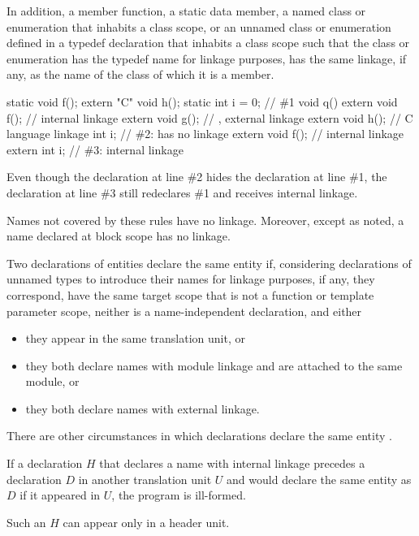 \pnum
In addition,
a member function,
a static data member,
a named class or enumeration that inhabits a class scope, or
an unnamed class or enumeration defined in a typedef declaration
that inhabits a class scope
such that the class or enumeration
has the typedef name for linkage purposes,
has the same linkage, if any, as the name of the class of which it is a member.

\pnum
\begin{example}
\begin{codeblock}
static void f();
extern "C" void h();
static int i = 0;               // \#1
void q() {
  extern void f();              // internal linkage
  extern void g();              // , external linkage
  extern void h();              // C language linkage
  int i;                        // \#2:  has no linkage
  {
    extern void f();            // internal linkage
    extern int i;               // \#3: internal linkage
  }
}
\end{codeblock}
Even though the declaration at line \#2 hides the declaration at line \#1,
the declaration at line \#3 still redeclares \#1 and receives internal linkage.
\end{example}

\pnum
{}%
Names not covered by these rules have no linkage. Moreover, except as
noted, a name declared at block scope has no
linkage.

\pnum
Two declarations of entities declare the same entity
if, considering declarations of unnamed types to introduce their names
for linkage purposes, if any,
they correspond,
have the same target scope that is not a function or template parameter scope,
neither is a name-independent declaration,
and either
\begin{itemize}
\item
they appear in the same translation unit, or
\item
they both declare names with module linkage and are attached to the same module, or
\item
they both declare names with external linkage.
\end{itemize}
\begin{note}
There are other circumstances in which declarations declare the same entity%
.
\end{note}

\pnum
If a declaration $H$ that declares a name with internal linkage
precedes a declaration $D$ in another translation unit $U$ and
would declare the same entity as $D$ if it appeared in $U$,
the program is ill-formed.
\begin{note}
Such an $H$ can appear only in a header unit.
\end{note}

